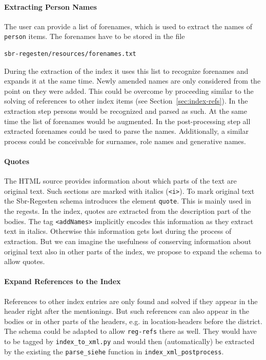 \paragraph{Extracting Person Names}
The user can provide a list of forenames, which is used to extract the
names of \texttt{person} items. The forenames have to be stored in the
file

\begin{verbatim}
sbr-regesten/resources/forenames.txt
\end{verbatim}

During the extraction of the index it uses this list to recognize
forenames and expands it at the same time. Newly amended names are
only considered from the point on they were added. This could be
overcome by proceeding similar to the solving of references to other
index items (see Section~\ref{sec:index-refs}). In the extraction step
persons would be recognized and parsed as such. At the same time the
list of forenames would be augmented. In the post-processing step all
extracted forenames could be used to parse the names. Additionally, a
similar process could be conceivable for surnames, role names and
generative names.

\paragraph{Quotes}
The HTML source provides information about which parts of the text are
original text. Such sections are marked with italics (\texttt{<i>}).
To mark original text the Sbr-Regesten schema introduces the element
\texttt{quote}. This is mainly used in the regests. In the index,
quotes are extracted from the description part of the bodies. The tag
\texttt{<addNames>} implicitly encodes this information as they
extract text in italics. Otherwise this information gets lost during
the process of extraction. But we can imagine the usefulness of
conserving information about original text also in other parts of the
index, we propose to expand the schema to allow quotes.

\paragraph{Expand References to the Index}
References to other index entries are only found and solved if they
appear in the header right after the mentionings. But such references
can also appear in the bodies or in other parts of the headers, e.g.
in location-headers before the district. The schema could be adapted
to allow \texttt{reg-refs} there as well. They would have to be tagged
by \texttt{index\_to\_xml.py} and would then (automatically) be
extracted by the existing the \texttt{parse\_siehe} function in
\texttt{index\_xml\_postprocess}.

